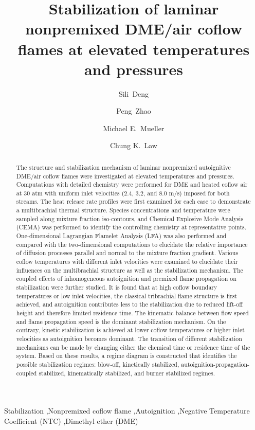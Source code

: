 \documentclass[review,3p,times]{elsarticle}
\begin{document}
\begin{frontmatter}

\title{Stabilization of laminar nonpremixed DME/air coflow flames at elevated temperatures and pressures}

\author{Sili~Deng}
\author{Peng~Zhao}
\author{Michael E.~Mueller}
\author{Chung K.~Law}

\address{Department of Mechanical and Aerospace Engineering, Princeton University, Princeton, NJ 08544, USA}

\begin{abstract}

The structure and stabilization mechanism of laminar nonpremixed autoignitive DME/air coflow flames were investigated at elevated temperatures and pressures. Computations with detailed chemistry were performed for DME and heated coflow air at $30$ atm with uniform inlet velocities ($2.4$, $3.2$, and $8.0$ m/s) imposed for both streams.  The heat release rate profiles were first examined for each case to demonstrate a multibrachial thermal structure.  Species concentrations and temperature were sampled along mixture fraction iso-contours, and Chemical Explosive Mode Analysis (CEMA) was performed to identify the controlling chemistry at representative points.  One-dimensional Lagrangian Flamelet Analysis (LFA) was also performed and compared with the two-dimensional computations to elucidate the relative importance of diffusion processes parallel and normal to the mixture fraction gradient.  Various coflow temperatures with different inlet velocities were examined to elucidate their influences on the multibrachial structure as well as the stabilization mechanism.  \textcolor{dl}{The coupled effects of inhomogeneous autoignition and premixed flame propagation on stabilization were further studied.}  It is found that at high coflow boundary temperatures or low inlet velocities, the classical tribrachial flame structure is first achieved, and autoignition contributes less to the stabilization due to reduced lift-off height and therefore limited residence time.  The kinematic balance between flow speed and flame propagation speed is the dominant stabilization mechanism.  On the contrary, kinetic stabilization is achieved at lower coflow temperatures or higher inlet velocities as autoignition becomes dominant.  The transition of different stabilization mechanisms can be made by changing either the chemical time or residence time of the system.  Based on these results, a regime diagram is constructed that identifies the possible stabilization regimes: blow-off, kinetically stabilized, autoignition-propagation-coupled stabilized, kinematically stabilized, and burner stabilized regimes.          

\end{abstract}

\begin{keyword} 
Stabilization \sep Nonpremixed coflow flame \sep Autoignition \sep Negative Temperature Coefficient (NTC) \sep Dimethyl ether (DME) 
\end{keyword}

\end{frontmatter}
\end{document}
